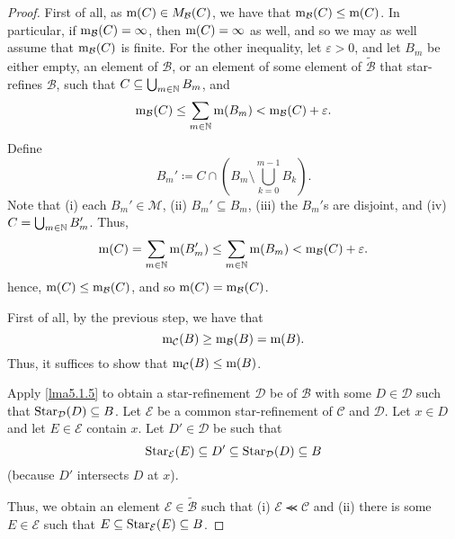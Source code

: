 \begin{thm}
\begin{savenotes}
\begin{proof}
First of all, as $\mathrm{m} (C)\in M_{\mathcal{B}}(C)$, we have that $\mathrm{m} _{\mathcal{B}}(C)\leq \mathrm{m} (C)$.  In particular, if $\mathrm{m} _{\mathcal{B}}(C)=\infty$, then $\mathrm{m} (C)=\infty$ as well, and so we may as well assume that $\mathrm{m} _{\mathcal{B}}(C)$ is finite.  For the other inequality, let $\varepsilon >0$, and let $B_m$ be either empty, an element of $\mathcal{B}$, or an element of some element of $\widetilde{\mathcal{B}}$ that star-refines $\mathcal{B}$, such that $C\subseteq \bigcup _{m\in \mathbb{N}}B_m$, and
\begin{equation}
\mathrm{m} _{\mathcal{B}}(C)\leq \sum _{m\in \mathbb{N}}\mathrm{m} (B_m)<\mathrm{m} _{\mathcal{B}}(C)+\varepsilon .
\end{equation}
Define
\begin{equation}
B_m'\coloneqq C\cap \left( B_m\setminus \bigcup _{k=0}^{m-1}B_k\right) .
\end{equation}
Note that (i) each $B_m'\in \mathcal{M}$, (ii) $B_m'\subseteq B_m$, (iii) the $B_m'$s are disjoint, and (iv) $C=\bigcup _{m\in \mathbb{N}}B_m'$.  Thus,
\begin{equation}
\mathrm{m} (C)=\sum _{m\in \mathbb{N}}\mathrm{m} (B_m')\leq \sum _{m\in \mathbb{N}}\mathrm{m} (B_m)<\mathrm{m} _{\mathcal{B}}(C)+\varepsilon .
\end{equation}
hence, $\mathrm{m} (C)\leq \mathrm{m} _{\mathcal{B}}(C)$, and so $\mathrm{m} (C)=\mathrm{m} _{\mathcal{B}}(C)$.

\label{stpCaratheodorysExtensionTheorem.2}
First of all, by the previous step, we have that
\begin{equation}
\mathrm{m} _{\mathcal{C}}(B)\geq \mathrm{m} _{\mathcal{B}}(B)=\mathrm{m} (B).
\end{equation}
Thus, it suffices to show that $\mathrm{m} _{\mathcal{C}}(B)\leq \mathrm{m} (B)$.

Apply \cref{lma5.1.5} to obtain a star-refinement $\mathcal{D}$ be of $\mathcal{B}$ with some $D\in \mathcal{D}$ such that $\operatorname{Star} _{\mathcal{D}}(D)\subseteq B$.  Let $\mathcal{E}$ be a common star-refinement of $\mathcal{C}$ and $\mathcal{D}$.  Let $x\in D$ and let $E\in \mathcal{E}$ contain $x$.  Let $D'\in \mathcal{D}$ be such that
\begin{equation}
\operatorname{Star} _{\mathcal{E}}(E)\subseteq D'\subseteq \operatorname{Star} _{\mathcal{D}}(D)\subseteq B
\end{equation}
(because $D'$ intersects $D$ at $x$).

Thus, we obtain an element $\mathcal{E}\in \widetilde{\mathcal{B}}$ such that (i) $\mathcal{E}\llcurly \mathcal{C}$ and (ii) there is some $E\in \mathcal{E}$ such that $E\subseteq \operatorname{Star} _{\mathcal{E}}(E)\subseteq B$.


\end{proof}
\end{savenotes}
\end{thm}
